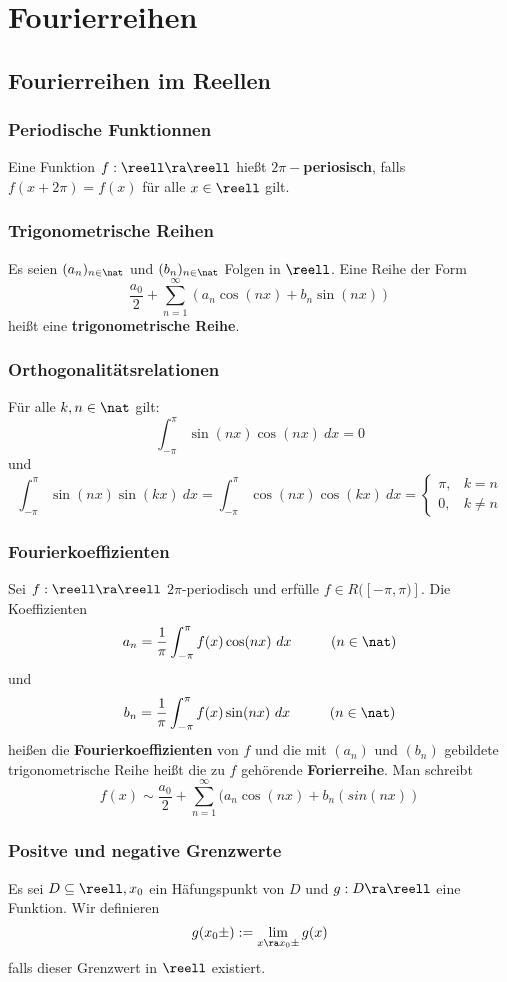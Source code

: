 \documentclass{kit}
\begin{document}
\section{Fourierreihen}
  \subsection{Fourierreihen im Reellen}
    \subsubsection{Periodische Funktionnen}
      Eine Funktion $f:\reell\ra\reell$ hießt $2\pi-$\textbf{periosisch}, falls $f(x+2\pi)=f(x)$ für alle $x\in\reell$ gilt.
    \subsubsection{Trigonometrische Reihen}
      Es seien $(a_n)_{n\in\nat}$ und $(b_n)_{n\in\nat}$ Folgen in $\reell$. Eine Reihe der Form
      $$\frac{a_0}{2}+\sum^\infty_{n=1}(a_n\cos(nx)+b_n\sin(nx))$$
      heißt eine \textbf{trigonometrische Reihe}.
    \subsubsection{Orthogonalitätsrelationen}
      Für alle $k,n\in\nat$ gilt:
      $$\int^\pi_{-\pi}\sin(nx)\cos(nx)\ dx=0$$
      und
      $$\int^\pi_{-\pi}\sin(nx)\sin(kx)\ dx=\int^\pi_{-\pi}\cos(nx)\cos(kx)\ dx=\begin{cases}
        \pi, & k=n\\
        0, & k\neq n
      \end{cases}$$
    \subsubsection{Fourierkoeffizienten}
      Sei $f:\reell\ra\reell$ $2\pi$-periodisch und erfülle $f\in R([-\pi,\pi)]$. Die Koeffizienten 
      $$a_n=\frac{1}{\pi}\int^\pi_{-\pi}f(x)\cos(nx)\ dx\hspace{1cm}(n\in\nat)$$
      und
      $$b_n=\frac{1}{\pi}\int^\pi_{-\pi}f(x)\sin(nx)\ dx\hspace{1cm}(n\in\nat)$$
      heißen die \textbf{Fourierkoeffizienten} von $f$ und die mit $(a_n)$ und $(b_n)$ gebildete trigonometrische Reihe
      heißt die zu $f$ gehörende \textbf{Forierreihe}. Man schreibt
      $$f(x)\sim\frac{a_0}{2}+\sum^\infty_{n=1}(a_n\cos(nx)+b_n(sin(nx))$$
    \subsubsection{Positve und negative Grenzwerte}
      Es sei $D\subseteq\reell,x_0$ ein Häfungspunkt von $D$ und $g:D\ra\reell$ eine Funktion. Wir definieren
      $$g(x_0\pm):=\lim_{x\ra x_0\pm}g(x)$$
      falls dieser Grenzwert in $\reell$ existiert.
\end{document}
